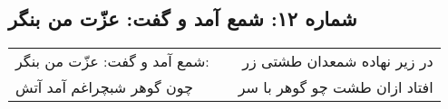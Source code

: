 \begin{center}
\section*{شماره ۱۲: شمع آمد و گفت: عزّت من بنگر}
\label{sec:012}
\begin{longtable}{l p{0.5cm} r}
شمع آمد و گفت: عزّت من بنگر:
&&
در زیر نهاده شمعدان طشتی زر
\\
چون گوهر شبچراغم آمد آتش
&&
افتاد ازان طشت چو گوهر با سر
\\
\end{longtable}
\end{center}
